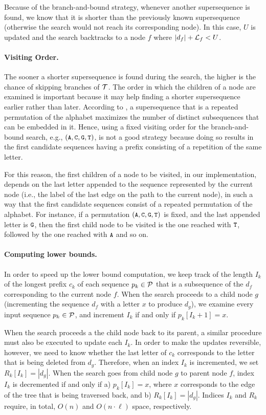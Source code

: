Because of the branch-and-bound strategy, whenever another supersequence is
found, we know that it is shorter than the previously known supersequence
(otherwise the search would not reach its corresponding node). In this case, $U$
is updated and the search backtracks to a node $f$ where $|d_f| + {\mathcal{L}}_f < U$.

\paragraph{Visiting Order.} The sooner a shorter supersequence is found during
the search, the higher is the chance of skipping branches of ${\mathcal{T}}$. The order
in which the children of a node are examined is important because it may help
finding a shorter supersequence earlier rather than later. According to
\citet{Chase1976}, a supersequence that is a repeated permutation of the
alphabet maximizes the number of distinct subsequences that can be embedded in
it. Hence, using a fixed visiting order for the branch-and-bound search, e.g.,
$(\text{\small{\tt A}}, \text{\small{\tt C}}, \text{\small{\tt G}}, \text{\small{\tt T}})$, is not a good strategy because doing so results in the
first candidate sequences having a prefix consisting of a repetition of the
same letter.

For this reason, the first children of a node to be visited, in our
implementation, depends on the last letter appended to the sequence represented
by the current node (i.e., the label of the last edge on the path to the current
node), in such a way that the first candidate sequences consist of a repeated
permutation of the alphabet. For instance, if a permutation $(\text{\small{\tt A}},\text{\small{\tt C}},\text{\small{\tt G}},\text{\small{\tt T}})$
is fixed, and the last appended letter is $\text{\small{\tt G}}$, then the first child node to
be visited is the one reached with $\text{\small{\tt T}}$, followed by the one reached with $\text{\small{\tt A}}$
and so on.

\paragraph{Computing lower bounds.} 
In order to speed up the lower bound computation, we keep track of the length
$I_k$ of the longest prefix $c_k$ of each sequence $p_k \in {\mathcal{P}}$ that is a
subsequence of the $d_f$ corresponding to the current node $f$. When the search
proceeds to a child node $g$ (incrementing the sequence $d_f$ with a letter $x$
to produce $d_g$), we examine every input sequence $p_k \in {\mathcal{P}}$, and
increment $I_k$ if and only if $p_k[I_k + 1] = x$.

When the search proceeds a the child node back to its parent, a similar
procedure must also be executed to update each $I_k$. In order to make the
updates reversible, however, we need to know whether the last letter of $c_k$
corresponds to the letter that is being deleted from $d_g$. Therefore, when an
index $I_k$ is incremented, we set $R_k[I_k] = |d_g|$. When the search goes from
child node $g$ to parent node $f$, index $I_k$ is decremented if and only if a)
$p_k[I_k] = x$, where $x$ corresponds to the edge of the tree that is being
traversed back, and b) $R_k[I_k] = |d_g|$. Indices $I_k$ and $R_k$ require, in
total, $O(n)$ and $O(n \cdot \ell)$ space, respectively.

